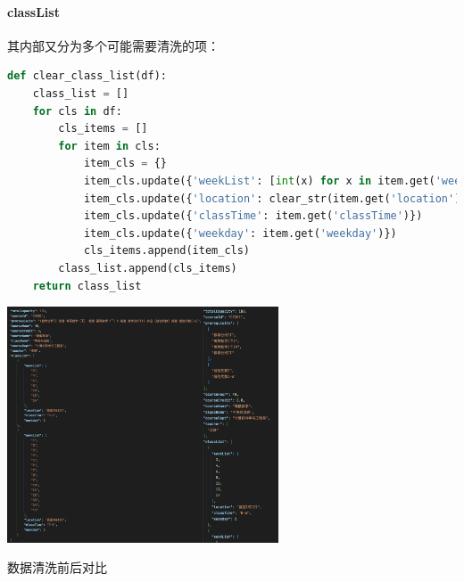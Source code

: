 \paragraph{classList}
其内部又分为多个可能需要清洗的项：
\begin{lstlisting}[language=python]
def clear_class_list(df):
    class_list = []
    for cls in df:
        cls_items = []
        for item in cls:
            item_cls = {}
            item_cls.update({'weekList': [int(x) for x in item.get('weekList')]})
            item_cls.update({'location': clear_str(item.get('location'))})
            item_cls.update({'classTime': item.get('classTime')})
            item_cls.update({'weekday': item.get('weekday')})
            cls_items.append(item_cls)
        class_list.append(cls_items)
    return class_list
\end{lstlisting}
\vspace{-1em}
\centerline{\includegraphics[height=7cm]{dta/clbf.png}\qquad\includegraphics[height=7cm]{dta/claf.png}}
\scriptsize
\centerline{数据清洗前后对比}
\normalsize

